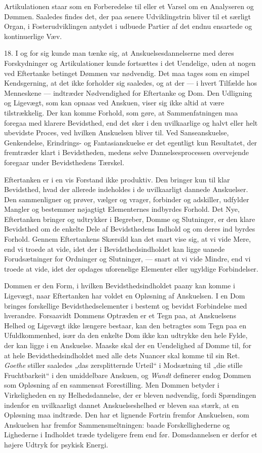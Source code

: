 \documentclass[12pt,a4paper]{book}
\newcommand{\opage}[1]{\marginnote{\footnotesize\textit{[#1]}}}
\begin{document}
Artikulationen staar som en Forberedelse til eller et Varsel om en
Analyseren og Dømmen. Saaledes findes det, der paa senere Udviklingstrin
bliver til et særligt Organ, i Fosterudviklingen antydet i udbuede
Partier af det endnu ensartede og kontinuerlige Væv.

18. I og for sig kunde man tænke sig, at Anskuelsesdannelserne med deres
Forskydninger og Artikulationer kunde fortsættes i det Uendelige, uden at
nogen ved Eftertanke betinget Dømmen var nødvendig. Det maa tages som en
simpel Kendsgerning, at det ikke forholder sig saaledes, og at der --- i
hvert Tilfælde hos Menneskene --- indtræder Nødvendighed for Eftertanke
og Dom. Den Udligning og Ligevægt, som kan opnaas ved Anskuen, viser sig
ikke altid at være tilstrækkelig. Der kan komme Forhold, som gøre, at
Sammenfatningen maa foregaa med klarere Bevidsthed, end det sker i den
uvilkaarlige og halvt eller helt ubevidste Proces, ved hvilken
Anskuelsen bliver til. Ved Sanseanskuelse, Genkendelse, Erindrings- og
Fantasianskuelse er det egentligt kun Resultatet, der fremtræder klart i
Bevidstheden, medens selve Dannelsesprocessen overvejende foregaar under
Bevidsthedens Tærskel.

Eftertanken er i en vis Forstand ikke produktiv. Den bringer kun til
klar Bevidsthed, hvad der allerede indeholdes i de uvilkaarligt dannede
Anskuelser. Den sammenligner og prøver, vælger og vrager, forbinder og
adskiller, udfylder Mangler og bestemmer nøjagtigt Elementernes indbyrdes
Forhold. Det Nye, Eftertanken bringer og udtrykker i Begreber, Domme og
Slutninger, er den klare Bevidsthed om de enkelte Dele af Bevidsthedens
Indhold og om deres ind%
\opage{57}byrdes Forhold. Gennem Eftertankens Skærsild kan
det snart vise sig, at vi vide Mere, end vi troede at vide, idet der i
Bevidsthedsindholdet kan ligge uanede Forudsætninger for Ordninger og
Slutninger, --- snart at vi vide Mindre, end vi troede at vide, idet der
opdages uforenelige Elementer eller ugyldige Forbindelser.

Dommen er den Form, i hvilken Bevidsthedsindholdet paany kan komme i
Ligevægt, naar Eftertanken har voldet en Opløsning af Anskuelsen. I en
Dom bringes forskellige Bevidsthedselementer i bestemt og bevidst
Forbindelse med hverandre. Forsaavidt Dommens Optræden er et Tegn paa, at
Anskuelsens Helhed og Ligevægt ikke længere bestaar, kan den betragtes
som Tegn paa en Ufuldkommenhed, især da den enkelte Dom ikke kan
udtrykke den hele Fylde, der kan ligge i en Anskuelse. Maaske skal der en
Uendelighed af Domme til, for at hele Bevidsthedsindholdet med alle dets
Nuancer skal komme til sin Ret. \emph{Goethe} stiller saaledes „das
zersplitternde Urteil“ i Modsætning til „die stille Fruchtbarkeit“ i den
umiddelbare Anskuen, og \emph{Wundt} definerer endog Dommen som
Opløsning af en sammensat Forestilling. Men Dommen betyder i
Virkeligheden en ny Helhedsdannelse, der er bleven nødvendig, fordi
Spændingen indenfor en uvilkaarligt dannet Anskuelseshelhed er bleven saa
stærk, at en Opløsning maa indtræde. Den har et lignende Fortrin fremfor
Anskuelsen, som Anskuelsen har fremfor Sammensmeltningen: baade
Forskellighederne og Lighederne i Indholdet træde tydeligere frem end
før. Domsdannelsen er derfor et højere Udtryk for psykisk Energi.
\end{document}

